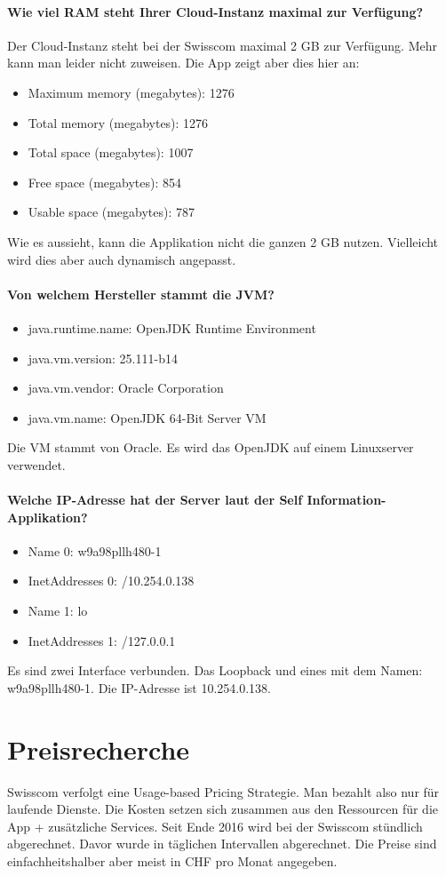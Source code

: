 \subsubsection{Wie viel RAM steht Ihrer Cloud-Instanz maximal zur Verfügung?}
Der Cloud-Instanz steht bei der Swisscom maximal 2 GB zur Verfügung. Mehr kann man leider nicht zuweisen.
Die App zeigt aber dies hier an:
\begin{itemize}
\item		Maximum memory (megabytes): 1276
\item		Total memory (megabytes): 1276
\item		Total space (megabytes): 1007
\item		Free space (megabytes): 854
\item		Usable space (megabytes): 787
\end{itemize}
Wie es aussieht, kann die Applikation nicht die ganzen 2 GB nutzen. Vielleicht wird dies aber auch dynamisch angepasst.
\subsubsection{Von welchem Hersteller stammt die JVM?}
\begin{itemize}
\item		java.runtime.name: OpenJDK Runtime Environment
\item		java.vm.version: 25.111-b14
\item		java.vm.vendor: Oracle Corporation
\item		java.vm.name: OpenJDK 64-Bit Server VM
\end{itemize}
Die VM stammt von Oracle. Es wird das OpenJDK auf einem Linuxserver verwendet.
\subsubsection{Welche IP-Adresse hat der Server laut der Self Information-Applikation?}
\begin{itemize}
\item		Name 0: w9a98pllh480-1
\item		InetAddresses 0: /10.254.0.138
\item		Name 1: lo
\item		InetAddresses 1: /127.0.0.1
\end{itemize}
Es sind zwei Interface verbunden. Das Loopback und eines mit dem Namen: w9a98pllh480-1. Die IP-Adresse ist 10.254.0.138. 
\chapter{Preisrecherche}
Swisscom verfolgt eine Usage-based Pricing Strategie. Man bezahlt also nur für laufende Dienste. Die Kosten setzen sich zusammen aus den Ressourcen für die App + zusätzliche Services. Seit Ende 2016 wird bei der Swisscom stündlich abgerechnet. Davor wurde in täglichen Intervallen abgerechnet. Die Preise sind einfachheitshalber aber meist in CHF pro Monat angegeben. 

